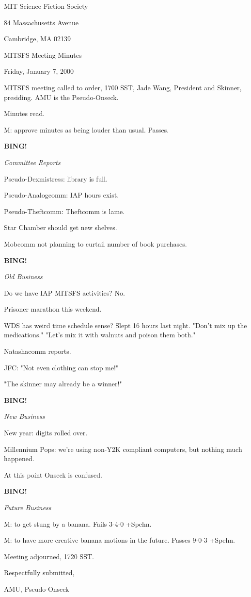 \documentclass[12pt]{article}
\newcommand{\bing}{{\bf BING!} }
\newcommand{\goto}[1]{\bing \vskip 12pt \centerline{{\em{#1}}}}
\begin{document}
\begin{center}

MIT Science Fiction Society 

84 Massachusetts Avenue

Cambridge, MA 02139

\vspace{12pt}

MITSFS Meeting Minutes 

Friday, January 7, 2000

\end{center}
 
\vspace{18pt}

\setlength{\parskip}{6pt}

\noindent
MITSFS meeting called to order, 1700 SST, Jade Wang, President and
Skinner, presiding.  AMU is the Pseudo-Onseck.

Minutes read.

M: approve minutes as being louder than usual. Passes.

\goto{Committee Reports}

Pseudo-Dexmistress: library is full.

Pseudo-Analogcomm: IAP hours exist.

Pseudo-Theftcomm: Theftcomm is lame.

Star Chamber should get new shelves.

Mobcomm not planning to curtail number of book purchases.

\goto{Old Business}
Do we have IAP MITSFS activities? No.

Prisoner marathon this weekend.

WDS has weird time schedule sense? Slept 16 hours last night. "Don't mix up the medications." "Let's mix it with walnuts and poison them both."

Natashacomm reports.

JFC: "Not even clothing can stop me!"

"The skinner may already be a winner!"

\goto{New Business}

New year: digits rolled over.

Millennium Pops: we're using non-Y2K compliant computers, but nothing much happened.

At this point Onseck is confused.

\goto{Future Business}

M: to get stung by a banana. Fails 3-4-0 +Spehn.

M: to have more creative banana motions in the future. Passes 9-0-3 +Spehn.

\vspace{12pt}

\noindent
Meeting adjourned, 1720 SST.

\vspace{18pt}

\centerline{Respectfully submitted,}
\centerline{AMU, Pseudo-Onseck}
\end{document}
